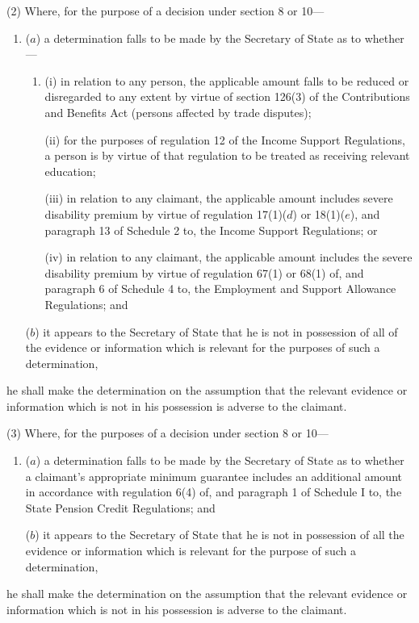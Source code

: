 \documentclass[12pt,a4paper]{article}
\begin{document}
(2) Where, for the purpose of a decision under section 8 or 10—
\begin{enumerate}\item[]
($a$) a determination falls to be made by the Secretary of State as to whether—
\begin{enumerate}\item[]
(i) in relation to any person, the applicable amount falls to be reduced or disregarded to any extent by virtue of section 126(3) of the Contributions and Benefits Act (persons affected by trade disputes);

(ii) for the purposes of regulation 12 of the Income Support Regulations, a person is by virtue of that regulation to be treated as receiving relevant education; 

(iii) in relation to any claimant, the applicable amount includes severe disability premium by virtue of regulation 17(1)($d$) or 18(1)($e$), and paragraph 13 of Schedule 2 to, the Income Support Regulations; 
%
or

(iv) in relation to any claimant, the applicable amount includes the severe disability premium by virtue of regulation 67(1) or 68(1) of, and paragraph 6 of Schedule 4 to, the Employment and Support Allowance Regulations; and
\end{enumerate}

($b$) it appears to the Secretary of State that he is not in possession of all of the evidence or information which is relevant for the purposes of such a determination,
\end{enumerate}
he shall make the determination on the assumption that the relevant evidence or information which is not in his possession is adverse to the claimant.

(3) Where, for the purposes of a decision under section 8 or 10—
\begin{enumerate}\item[]
($a$) a determination falls to be made by the Secretary of State as to whether a claimant’s appropriate minimum guarantee includes an additional amount in accordance with regulation 6(4) of, and paragraph 1 of Schedule I to, the State Pension Credit Regulations; and

($b$) it appears to the Secretary of State that he is not in possession of all the evidence or information which is relevant for the purpose of such a determination,
\end{enumerate}
he shall make the determination on the assumption that the relevant evidence or information which is not in his possession is adverse to the claimant.
\end{document}
